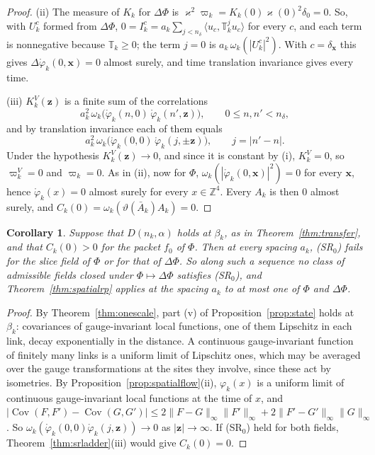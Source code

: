 \documentclass[aps,prd,twocolumn,superscriptaddress,nofootinbib,longbibliography,floatfix,amsmath,amssymb,10pt]{revtex4-2}
\newtheorem{corollary}[theorem]{Corollary}
\theoremstyle{definition}
\theoremstyle{remark}
\newcommand{\Z}{\mathbb{Z}}
\newcommand{\Cov}{\operatorname{Cov}}
\newcommand{\ip}[2]{\langle #1,#2\rangle}
\begin{document}
\begin{proof}
(ii) The measure of $K_k$ for $\Delta\Phi$ is $\varkappa^2\varpi_k=
K_k(0)\varkappa(0)^2\delta_0=0$. So, with $U^c_k$ formed from $\Delta\Phi$,
$0=I^c_k=a_k\sum_{j<n_\delta}\ip{u_c}{\mathbb T_k^ju_c}$ for every $c$,
and each term is nonnegative because $\mathbb T_k\ge0$; the term $j=0$ is
$a_k\,\omega_k(|U^c_k|^2)$. With $c=\delta_{\mathbf x}$ this gives
$\Delta\mathring\varphi_k(0,\mathbf x)=0$ almost surely, and time
translation invariance gives every time.

(iii) $K^V_k(\mathbf z)$ is a finite sum of the correlations
\[
a_k^2\,\omega_k\bigl(\mathring\varphi_k(n,0)\,\mathring\varphi_k(n',
\mathbf z)\bigr),\qquad0\le n,n'<n_\delta ,
\]
and by translation invariance each of them equals
\[
a_k^2\,\omega_k\bigl(\mathring\varphi_k(0,0)\,\mathring\varphi_k(j,
\pm\mathbf z)\bigr),\qquad j=|n'-n| .
\]
Under the hypothesis $K^V_k(\mathbf z)\to0$, and since it
is constant by (i), $K^V_k=0$, so $\varpi^V_k=0$ and $\varpi_k=0$. As in
(ii), now for $\Phi$, $\omega_k(|\mathring\varphi_k(0,\mathbf x)|^2)=0$ for
every $\mathbf x$, hence $\mathring\varphi_k(x)=0$ almost surely for every
$x\in\Z^4$. Every $A_k$ is then $0$ almost surely, and $C_k(0)=
\omega_k(\vartheta(\bar A_k)A_k)=0$.
\end{proof}

\begin{corollary}\label{cor:srladder}
Suppose that $D(n_k,\alpha)$ holds at $\beta_k$, as in
Theorem~\textup{\ref{thm:transfer}}, and that $C_k(0)>0$ for the packet
$f_0$ of $\Phi$. Then at every spacing $a_k$, \textup{(SR$_0$)} fails for
the slice field of $\Phi$ or for that of $\Delta\Phi$. So along such a
sequence no class of admissible fields closed under $\Phi\mapsto\Delta\Phi$
satisfies \textup{(SR$_0$)}, and Theorem~\textup{\ref{thm:spatialrp}}
applies at the spacing $a_k$ to at most one of $\Phi$ and $\Delta\Phi$.
\end{corollary}

\begin{proof}
By Theorem~\ref{thm:onescale}, part (v) of Proposition~\ref{prop:state}
holds at $\beta_k$: covariances of gauge-invariant local functions, one of
them Lipschitz in each link, decay exponentially in the distance. A
continuous gauge-invariant function of finitely many links is a uniform
limit of Lipschitz ones, which may be averaged over the gauge
transformations at the sites they involve, since these act by isometries.
By Proposition~\ref{prop:spatialflow}(ii), $\varphi_k(x)$ is a uniform limit
of continuous gauge-invariant local functions at the time of $x$, and
$|\Cov(F,F')-\Cov(G,G')|\le2\|F-G\|_\infty\|F'\|_\infty+2\|F'-G'\|_\infty
\|G\|_\infty$. So $\omega_k(\mathring\varphi_k(0,0)\mathring\varphi_k(j,
\mathbf z))\to0$ as $|\mathbf z|\to\infty$. If (SR$_0$) held for both
fields, Theorem~\ref{thm:srladder}(iii) would give $C_k(0)=0$.
\end{proof}
\end{document}
